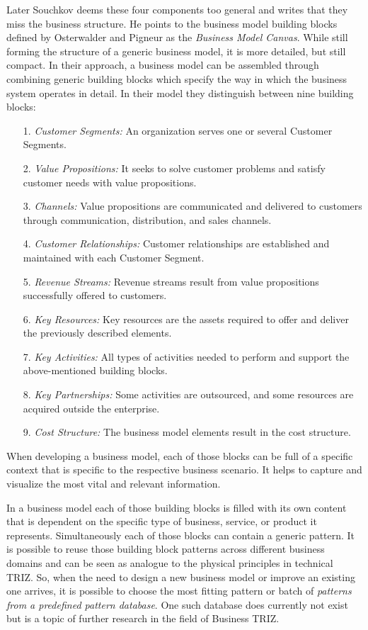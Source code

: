 \documentclass[11pt,a4paper]{article}
\begin{document}
Later Souchkov \cite{6} deems these four components too general and writes
that they miss the business structure. He points to the business model
building blocks defined by Osterwalder and Pigneur \cite{14} as the
\emph{Business Model Canvas}. While still forming the structure of a generic
business model, it is more detailed, but still compact. In their approach, a
business model can be assembled through combining generic building blocks
which specify the way in which the business system operates in detail. In
their model they distinguish between nine building blocks:
\begin{itemize}
\item[1.] \emph{Customer Segments:} An organization serves one or several
  Customer Segments.
\item[2.] \emph{Value Propositions:} It seeks to solve customer problems and
  satisfy customer needs with value propositions.
\item[3.] \emph{Channels:} Value propositions are communicated and delivered
  to customers through communication, distribution, and sales channels.
\item[4.] \emph{Customer Relationships:} Customer relationships are
  established and maintained with each Customer Segment.
\item[5.] \emph{Revenue Streams:} Revenue streams result from value
  propositions successfully offered to customers.
\item[6.] \emph{Key Resources:} Key resources are the assets required to offer
  and deliver the previously described elements.
\item[7.] \emph{Key Activities:} All types of activities needed to perform and
  support the above-mentioned building blocks.
\item[8.] \emph{Key Partnerships:} Some activities are outsourced, and some
  resources are acquired outside the enterprise.
\item[9.] \emph{Cost Structure:} The business model elements result in the
  cost structure.
\end{itemize}
When developing a business model, each of those blocks can be full of a
specific context that is specific to the respective business scenario. It
helps to capture and visualize the most vital and relevant information.

In a business model each of those building blocks is filled with its own
content that is dependent on the specific type of business, service, or
product it represents. Simultaneously each of those blocks can contain a
generic pattern. It is possible to reuse those building block patterns across
different business domains and can be seen as analogue to the physical
principles in technical TRIZ. So, when the need to design a new business model
or improve an existing one arrives, it is possible to choose the most fitting
pattern or batch of \emph{patterns from a predefined pattern database}. One
such database does currently not exist but is a topic of further research in
the field of Business TRIZ.
\end{document}
